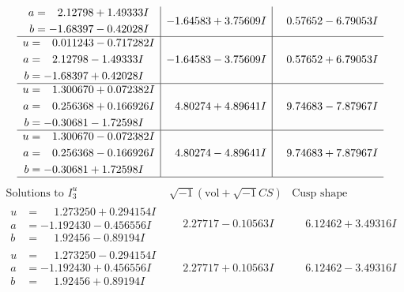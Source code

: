 \documentclass[1p]{elsarticle_modified}
\theoremstyle{definition}
\newcommand{\I}{\sqrt{-1}}
\begin{document}
$$\begin{array}{c|c|c}
\begin{aligned}
a &= \phantom{-}2.12798 + 1.49333 I \\
b &= -1.68397 - 0.42028 I\end{aligned}
 & -1.64583 + 3.75609 I & \phantom{-}0.57652 - 6.79053 I \\ \hline\begin{aligned}
u &= \phantom{-}0.011243 - 0.717282 I \\
a &= \phantom{-}2.12798 - 1.49333 I \\
b &= -1.68397 + 0.42028 I\end{aligned}
 & -1.64583 - 3.75609 I & \phantom{-}0.57652 + 6.79053 I \\ \hline\begin{aligned}
u &= \phantom{-}1.300670 + 0.072382 I \\
a &= \phantom{-}0.256368 + 0.166926 I \\
b &= -0.30681 - 1.72598 I\end{aligned}
 & \phantom{-}4.80274 + 4.89641 I & \phantom{-}9.74683 - 7.87967 I \\ \hline\begin{aligned}
u &= \phantom{-}1.300670 - 0.072382 I \\
a &= \phantom{-}0.256368 - 0.166926 I \\
b &= -0.30681 + 1.72598 I\end{aligned}
 & \phantom{-}4.80274 - 4.89641 I & \phantom{-}9.74683 + 7.87967 I\\
 \hline 
 \end{array}$$\newpage$$\begin{array}{c|c|c}  
\text{Solutions to }I^u_{3}& \I (\text{vol} + \sqrt{-1}CS) & \text{Cusp shape}\\
 \hline 
\begin{aligned}
u &= \phantom{-}1.273250 + 0.294154 I \\
a &= -1.192430 - 0.456556 I \\
b &= \phantom{-}1.92456 - 0.89194 I\end{aligned}
 & \phantom{-}2.27717 - 0.10563 I & \phantom{-}6.12462 + 3.49316 I \\ \hline\begin{aligned}
u &= \phantom{-}1.273250 - 0.294154 I \\
a &= -1.192430 + 0.456556 I \\
b &= \phantom{-}1.92456 + 0.89194 I\end{aligned}
 & \phantom{-}2.27717 + 0.10563 I & \phantom{-}6.12462 - 3.49316 I \\ \hline\begin{aligned}

\end{aligned}
\end{array}$$
\end{document}
